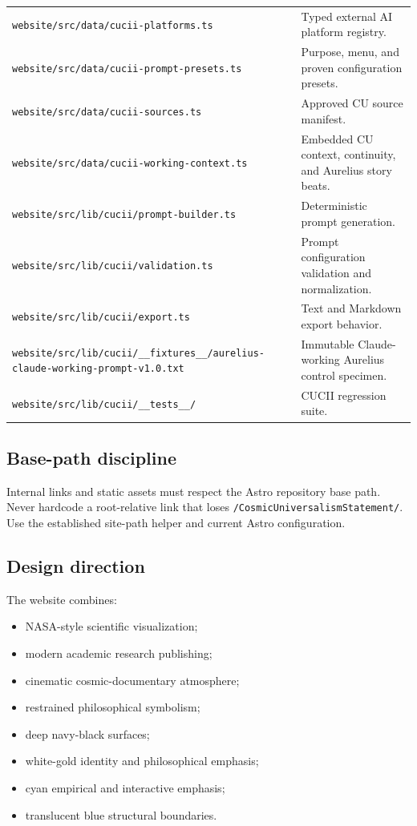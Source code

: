 \documentclass[11pt,letterpaper]{article}
\newcommand{\filepath}[1]{\nolinkurl{#1}}
\begin{document}
\begin{longtable}{L{2.55in}L{3.85in}}
\filepath{website/src/data/cucii-platforms.ts} & Typed external AI platform registry. \\
\filepath{website/src/data/cucii-prompt-presets.ts} & Purpose, menu, and proven configuration presets. \\
\filepath{website/src/data/cucii-sources.ts} & Approved CU source manifest. \\
\filepath{website/src/data/cucii-working-context.ts} & Embedded CU context, continuity, and Aurelius story beats. \\
\filepath{website/src/lib/cucii/prompt-builder.ts} & Deterministic prompt generation. \\
\filepath{website/src/lib/cucii/validation.ts} & Prompt configuration validation and normalization. \\
\filepath{website/src/lib/cucii/export.ts} & Text and Markdown export behavior. \\
\filepath{website/src/lib/cucii/__fixtures__/aurelius-claude-working-prompt-v1.0.txt} & Immutable Claude-working Aurelius control specimen. \\
\filepath{website/src/lib/cucii/__tests__/} & CUCII regression suite. \\
\bottomrule
\end{longtable}

\subsection{Base-path discipline}

Internal links and static assets must respect the Astro repository base path.
Never hardcode a root-relative link that loses
\filepath{/CosmicUniversalismStatement/}. Use the established site-path helper
and current Astro configuration.

\subsection{Design direction}

The website combines:

\begin{itemize}
    \item NASA-style scientific visualization;
    \item modern academic research publishing;
    \item cinematic cosmic-documentary atmosphere;
    \item restrained philosophical symbolism;
    \item deep navy-black surfaces;
    \item white-gold identity and philosophical emphasis;
    \item cyan empirical and interactive emphasis;
    \item translucent blue structural boundaries.
\end{itemize}
\end{document}

